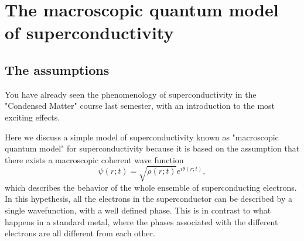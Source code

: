 \documentclass[a4paper,11pt]{article}
\newcommand{\ddp}[2]{\frac{\partial #1}{\partial #2 }}
\begin{document}

\section {The macroscopic quantum model of superconductivity}
\subsection {The assumptions}
You have already seen the phenomenology of superconductivity in the "Condensed Matter" course last semester, with an introduction to the most exciting effects.

Here we discuss a simple model of superconductivity known as "macroscopic quantum model" for superconductivity because it is based on the assumption that there exists a macroscopic coherent wave function
\begin{equation}
    \psi (r;t) = \sqrt{\rho(r; t)} e^{i\theta(r; t)},
\end{equation}
which describes the behavior of the whole ensemble of superconducting electrons. In this hypethesis, all the electrons in the superconductor can be described by a single wavefunction, with a well defined phase. This is in contrast to what happens in a standard metal, where the phases associated with the different electrons are all different from each other.
\end{document}
